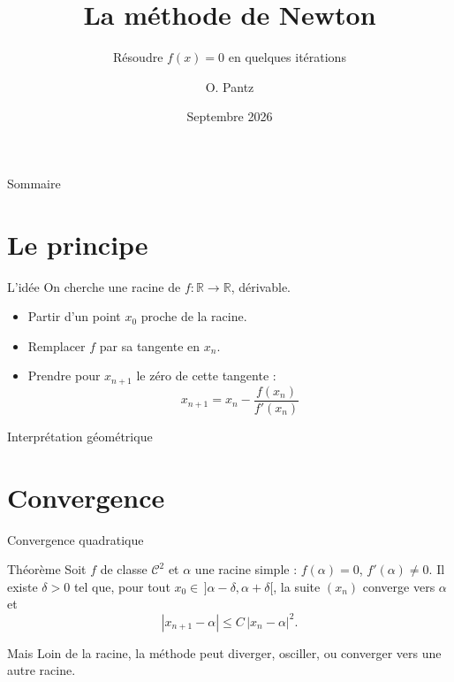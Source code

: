 \documentclass{beamer}
\title{La méthode de Newton}
\subtitle{Résoudre $f(x)=0$ en quelques itérations}
\author{O. Pantz}
\date{Septembre 2026}
\begin{document}
\begin{frame}
  \titlepage
\end{frame}

\begin{frame}{Sommaire}
  \tableofcontents
\end{frame}

\section{Le principe}

\begin{frame}{L'idée}
  On cherche une racine de $f : \mathbb{R} \to \mathbb{R}$, dérivable.
  \begin{itemize}[<+->]
    \item Partir d'un point $x_0$ proche de la racine.
    \item Remplacer $f$ par sa tangente en $x_n$.
    \item Prendre pour $x_{n+1}$ le zéro de cette tangente :
      \[ x_{n+1} = x_n - \frac{f(x_n)}{f'(x_n)} \]
  \end{itemize}
\end{frame}

\begin{frame}{Interprétation géométrique}
  \begin{center}
  \end{center}
\end{frame}

\section{Convergence}

\begin{frame}{Convergence quadratique}
  \begin{block}{Théorème}
    Soit $f$ de classe $\mathcal{C}^2$ et $\alpha$ une racine simple : $f(\alpha)=0$, $f'(\alpha)\neq 0$.
    Il existe $\delta>0$ tel que, pour tout $x_0 \in\,]\alpha-\delta,\alpha+\delta[$, la suite $(x_n)$ converge vers $\alpha$ et
    \[ |x_{n+1}-\alpha| \le C\,|x_n-\alpha|^2. \]
  \end{block}
  \pause
  \begin{alertblock}{Mais}
    Loin de la racine, la méthode peut diverger, osciller, ou converger vers une autre racine.
  \end{alertblock}
\end{frame}
\end{document}
